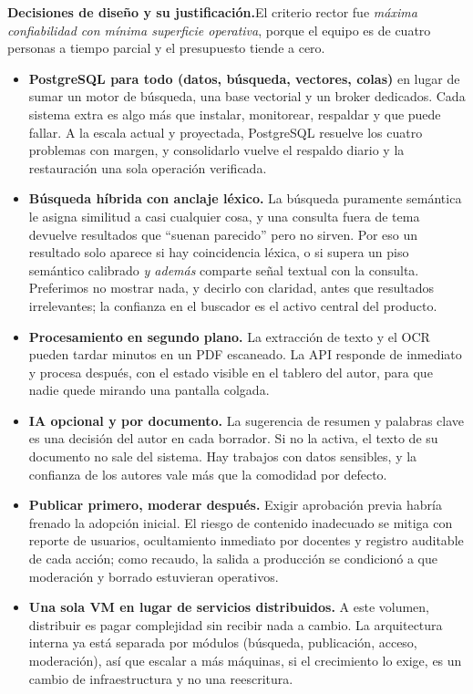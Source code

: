 \documentclass[12pt,a4paper]{article}
\begin{document}
\medskip
\noindent\textbf{Decisiones de diseño y su justificación.}\enspace El criterio rector fue \emph{máxima confiabilidad con mínima superficie operativa}, porque el equipo es de cuatro personas a tiempo parcial y el presupuesto tiende a cero.

\begin{itemize}
  \item \textbf{PostgreSQL para todo (datos, búsqueda, vectores, colas)} en lugar de sumar un motor de búsqueda, una base vectorial y un broker dedicados. Cada sistema extra es algo más que instalar, monitorear, respaldar y que puede fallar. A la escala actual y proyectada, PostgreSQL resuelve los cuatro problemas con margen, y consolidarlo vuelve el respaldo diario y la restauración una sola operación verificada.
  \item \textbf{Búsqueda híbrida con anclaje léxico.} La búsqueda puramente semántica le asigna similitud a casi cualquier cosa, y una consulta fuera de tema devuelve resultados que “suenan parecido” pero no sirven. Por eso un resultado solo aparece si hay coincidencia léxica, o si supera un piso semántico calibrado \emph{y además} comparte señal textual con la consulta. Preferimos no mostrar nada, y decirlo con claridad, antes que resultados irrelevantes; la confianza en el buscador es el activo central del producto.
  \item \textbf{Procesamiento en segundo plano.} La extracción de texto y el OCR pueden tardar minutos en un PDF escaneado. La API responde de inmediato y procesa después, con el estado visible en el tablero del autor, para que nadie quede mirando una pantalla colgada.
  \item \textbf{IA opcional y por documento.} La sugerencia de resumen y palabras clave es una decisión del autor en cada borrador. Si no la activa, el texto de su documento no sale del sistema. Hay trabajos con datos sensibles, y la confianza de los autores vale más que la comodidad por defecto.
  \item \textbf{Publicar primero, moderar después.} Exigir aprobación previa habría frenado la adopción inicial. El riesgo de contenido inadecuado se mitiga con reporte de usuarios, ocultamiento inmediato por docentes y registro auditable de cada acción; como recaudo, la salida a producción se condicionó a que moderación y borrado estuvieran operativos.
  \item \textbf{Una sola VM en lugar de servicios distribuidos.} A este volumen, distribuir es pagar complejidad sin recibir nada a cambio. La arquitectura interna ya está separada por módulos (búsqueda, publicación, acceso, moderación), así que escalar a más máquinas, si el crecimiento lo exige, es un cambio de infraestructura y no una reescritura.
\end{itemize}
\end{document}
